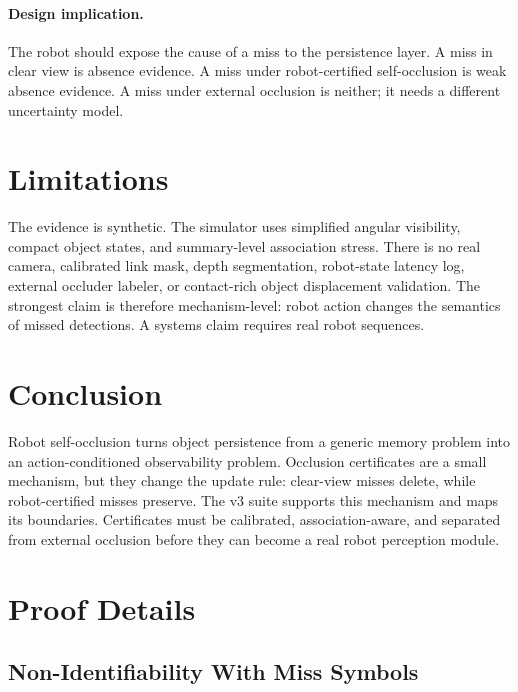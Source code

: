 \documentclass{article}
\begin{document}
\paragraph{Design implication.}
The robot should expose the cause of a miss to the persistence layer. A miss in
clear view is absence evidence. A miss under robot-certified self-occlusion is
weak absence evidence. A miss under external occlusion is neither; it needs a
different uncertainty model.

\section{Limitations}

The evidence is synthetic. The simulator uses simplified angular visibility,
compact object states, and summary-level association stress. There is no real
camera, calibrated link mask, depth segmentation, robot-state latency log,
external occluder labeler, or contact-rich object displacement validation. The
strongest claim is therefore mechanism-level: robot action changes the semantics
of missed detections. A systems claim requires real robot sequences.

\section{Conclusion}

Robot self-occlusion turns object persistence from a generic memory problem into
an action-conditioned observability problem. Occlusion certificates are a small
mechanism, but they change the update rule: clear-view misses delete, while
robot-certified misses preserve. The v3 suite supports this mechanism and maps
its boundaries. Certificates must be calibrated, association-aware, and
separated from external occlusion before they can become a real robot
perception module.




\appendix
\renewcommand{\thesection}{\arabic{section}}

\section{Proof Details}

\subsection{Non-Identifiability With Miss Symbols}
\end{document}
